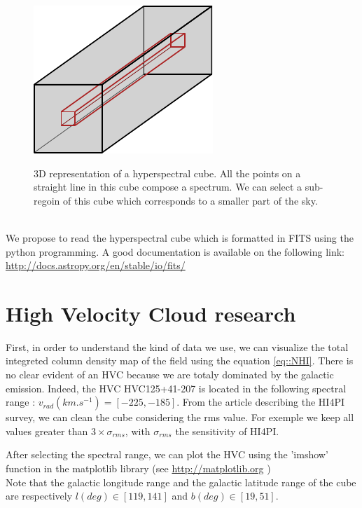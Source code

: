 \documentclass[a4paper,10.5pt]{report}
\begin{document}
\begin{figure}[h!]
  \centering
  \includegraphics[width=3.in]{hyperspectral.pdf}
  \label{fig::hyperspectral}
  \caption{3D representation of a hyperspectral cube. All the points on a straight line in this cube compose a spectrum.
  We can select a sub-regoin of this cube which corresponds to a smaller part of the sky.}
\end{figure} \\

We propose to read the hyperspectral cube which is formatted in FITS using the python programming.
A good documentation is available on the following link: 
\color{blue} \url{http://docs.astropy.org/en/stable/io/fits/} \color{black}

\section{High Velocity Cloud research}
First, in order to understand the kind of data we use, we can visualize the total integreted column density map of the field 
using the equation \ref{eq::NHI}. There is no clear evident of an HVC because we are totaly dominated by the galactic emission.
Indeed, the HVC HVC125+41-207 is located in the following spectral range : $v_{rad} (km.s^{-1}) = [-225, -185]$. 
From the article describing the HI4PI survey, we can clean the cube considering the rms value. For exemple we keep 
all values greater than $3 \times \sigma_{rms}$, with $\sigma_{rms}$ the sensitivity of HI4PI.


After selecting the spectral range, we can plot the HVC using the 'imshow' function in the matplotlib library 
(see \color{blue} \url{http://matplotlib.org} \color{black}) \\
Note that the galactic longitude range and the galactic latitude range of the cube are respectively
$l(deg) \in [119, 141]$ and $b(deg) \in [19, 51]$.
\end{document}
